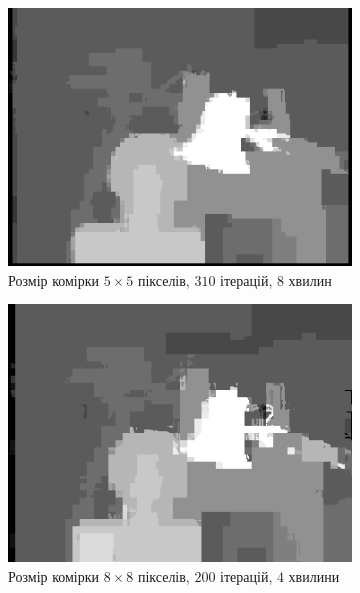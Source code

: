\begin{figure}[h]
\begin{subfigure}[t]{0.32\textwidth}
        \includegraphics[width=\textwidth]{images/tsukuba_superpixel_5}
        \caption{Розмір комірки $5\times 5$ пікселів,
                 $310$ ітерацій,
                 $8$ хвилин}
    \end{subfigure}
    \hfill
    \begin{subfigure}[t]{0.32\textwidth}
        \centering
        \includegraphics[width=\textwidth]{images/tsukuba_superpixel_8}
        \caption{Розмір комірки $8 \times 8$ пікселів,
                 $200$ ітерацій,
                 $4$ хвилини}
    \end{subfigure}
    \hfill
    \begin{subfigure}[t]{0.32\textwidth}
        \centering

\end{subfigure}
\end{figure}
